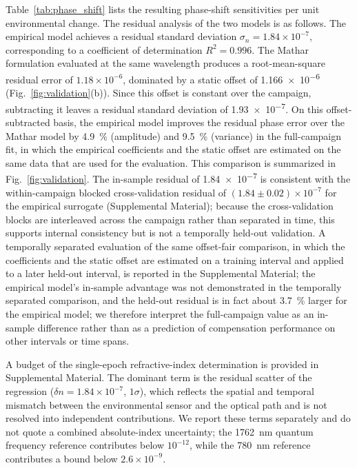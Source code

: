 \documentclass[aps,prapplied,reprint,groupedaddress,twocolumn,superscriptaddress,linenumbers]{revtex4-2}
\begin{document}
Table~\ref{tab:phase_shift} lists the resulting phase-shift sensitivities per unit environmental change. The residual analysis of the two models is as follows. The empirical model achieves a residual standard deviation $\sigma_n = 1.84 \times 10^{-7}$, corresponding to a coefficient of determination $R^2 = 0.996$. The Mathar formulation evaluated at the same wavelength produces a root-mean-square residual error of $1.18 \times 10^{-6}$, dominated by a static offset of \num{1.166e-6} (Fig.~\ref{fig:validation}(b)). Since this offset is constant over the campaign, subtracting it leaves a residual standard deviation of \num{1.93e-7}. On this offset-subtracted basis, the empirical model improves the residual phase error over the Mathar model by \SI{4.9}{\percent} (amplitude) and \SI{9.5}{\percent} (variance) in the full-campaign fit, in which the empirical coefficients and the static offset are estimated on the same data that are used for the evaluation. This comparison is summarized in Fig.~\ref{fig:validation}. The in-sample residual of \num{1.84e-7} is consistent with the within-campaign blocked cross-validation residual of $(1.84 \pm 0.02) \times 10^{-7}$ for the empirical surrogate (Supplemental Material); because the cross-validation blocks are interleaved across the campaign rather than separated in time, this supports internal consistency but is not a temporally held-out validation. A temporally separated evaluation of the same offset-fair comparison, in which the coefficients and the static offset are estimated on a training interval and applied to a later held-out interval, is reported in the Supplemental Material; the empirical model's in-sample advantage was not demonstrated in the temporally separated comparison, and the held-out residual is in fact about \SI{3.7}{\percent} larger for the empirical model; we therefore interpret the full-campaign value as an in-sample difference rather than as a prediction of compensation performance on other intervals or time spans.

A budget of the single-epoch refractive-index determination is provided in Supplemental Material. The dominant term is the residual scatter of the regression ($\delta n = 1.84 \times 10^{-7}$, $1\sigma$), which reflects the spatial and temporal mismatch between the environmental sensor and the optical path and is not resolved into independent contributions. We report these terms separately and do not quote a combined absolute-index uncertainty; the \SI{1762}{\nano\meter} quantum frequency reference contributes below $10^{-12}$, while the \SI{780}{\nano\meter} reference contributes a bound below $2.6 \times 10^{-9}$.
\end{document}
